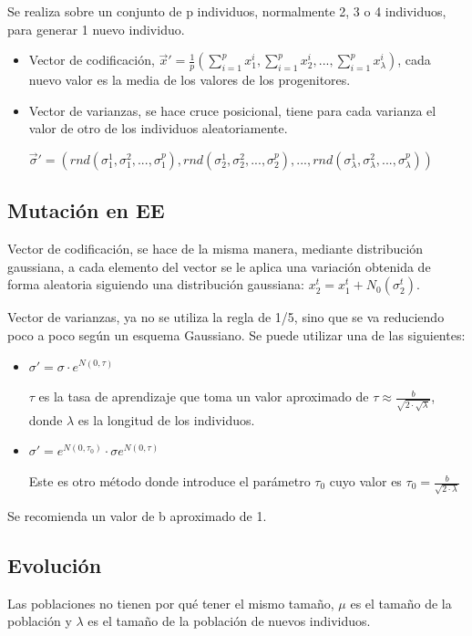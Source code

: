 \documentclass[12pt, twoside, openright]{report} %
\begin{document}
Se realiza sobre un conjunto de p individuos, normalmente 2, 3 o 4 individuos, para generar 1 nuevo individuo.

\begin{itemize}
	\item Vector de codificación, $\vec{x}'= \frac{1}{p}(\sum^p_{i=1}x_1^i,\sum^p_{i=1}x_2^i, ..., \sum^p_{i=1}x_\lambda^i)$, cada nuevo valor es la media de los valores de los progenitores.
	\item Vector de varianzas, se hace cruce posicional, tiene para cada varianza el valor de otro de los individuos aleatoriamente.
	
	$\vec{\sigma}'=(rnd(\sigma^1_1,\sigma^2_1, ..., \sigma^p_1), rnd(\sigma^1_2,\sigma^2_2, ..., \sigma^p_2), ..., rnd(\sigma^1_\lambda,\sigma^2_\lambda, ..., \sigma^p_\lambda))$
\end{itemize}

\subsection{Mutación en EE}
Vector de codificación, se hace de la misma manera, mediante distribución gaussiana, a cada elemento del vector se le aplica una variación obtenida de forma aleatoria siguiendo una distribución gaussiana: $x^t_2=x^t_1+N_0(\sigma^t_2)$.

Vector de varianzas, ya no se utiliza la regla de 1/5, sino que se va reduciendo poco a poco según un esquema Gaussiano. Se puede utilizar una de las siguientes: 
\begin{itemize}
	\item $\sigma'=\sigma \cdot e^{N(0,\tau)}$

	$\tau$ es la tasa de aprendizaje que toma un valor aproximado de $\tau \approx \frac{b}{\sqrt{2\cdot \sqrt{\lambda}}}$, donde $\lambda$ es la longitud de los individuos.
	\item $\sigma'=e^{N(0,\tau_0)}\cdot \sigma e^{N(0,\tau)}$
	
	Este es otro método donde introduce el parámetro $\tau_0$ cuyo valor es $\tau_0 = \frac{b}{\sqrt{2\cdot \lambda}}$
\end{itemize}

Se recomienda un valor de b aproximado de 1.

\subsection{Evolución}
Las poblaciones no tienen por qué tener el mismo tamaño, $\mu$ es el tamaño de la población y $\lambda$ es el tamaño de la población de nuevos individuos.
\end{document}
